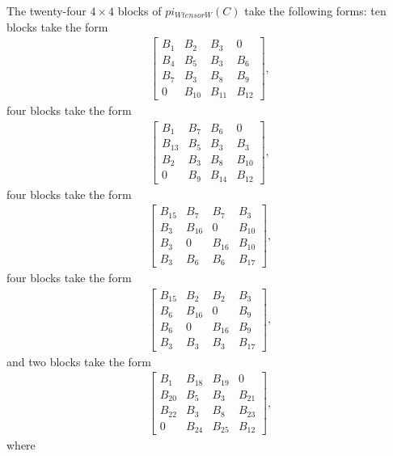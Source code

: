 \documentclass[10pt,a4paper]{amsart}
\numberwithin{equation}{section}
\theoremstyle{definition}
\def\pi{pi}
\def\otimes{ tensor }
\begin{document}
The twenty-four $4 \times 4$ blocks of $\pi_{W \otimes W}(C)$ take the following forms: ten blocks take the form
\begin{align*}
 \begin{bmatrix}
B_1 & B_2 & B_3 & 0\\
B_4 & B_5 & B_3 & B_6\\
B_7 & B_3 & B_8 & B_9\\
0 & B_{10} & B_{11} & B_{12}
 \end{bmatrix},
\end{align*}
four blocks take the form
\begin{align*}
 \begin{bmatrix}
B_1 & B_7 & B_6 & 0\\
B_{13} & B_5 & B_3 & B_3\\
B_2 & B_3 & B_8 & B_{10}\\
0 & B_9 & B_{14} & B_{12}
 \end{bmatrix},
\end{align*}
four blocks take the form
\begin{align*}
 \begin{bmatrix}
B_{15} & B_7 & B_7 & B_3\\
B_3 & B_{16} & 0 & B_{10}\\
B_3 & 0 & B_{16} & B_{10}\\
B_3 & B_6 & B_6 & B_{17}
 \end{bmatrix},
\end{align*}
four blocks take the form
\begin{align*}
 \begin{bmatrix}
B_{15} & B_2 & B_2 & B_3\\
B_6 & B_{16} & 0 & B_9\\
B_6 & 0 & B_{16} & B_9\\
B_3 & B_3 & B_3 & B_{17}
 \end{bmatrix},
\end{align*}
and two blocks take the form
\begin{align*}
 \begin{bmatrix}
B_1 & B_{18} & B_{19} & 0\\
B_{20} & B_5 & B_3 & B_{21}\\
B_{22} & B_3 & B_8 & B_{23}\\
0 & B_{24} & B_{25} & B_{12}
 \end{bmatrix},
\end{align*}
where\vspace{-1mm}
\end{document}
